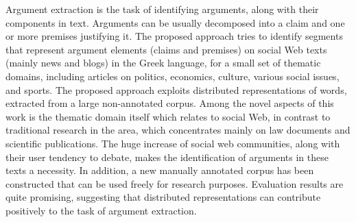 Argument extraction is the task of identifying arguments, along with their components in text. Arguments can be usually decomposed into a claim and one or more premises justifying it. The proposed approach tries to identify segments that represent argument elements (claims and premises) on social Web texts (mainly news and blogs) in the Greek language, for a small set of thematic domains, including articles on politics, economics, culture, various social issues, and sports. The proposed approach exploits distributed representations of words, extracted from a large non-annotated corpus. Among the novel aspects of this work is the thematic domain itself which relates to social Web, in contrast to traditional research in the area, which concentrates mainly on law documents and scientific publications. The huge increase of social web communities, along with their user tendency to debate, makes the identification of arguments in these texts a necessity. In addition, a new manually annotated corpus has been constructed that can be used freely for research purposes. Evaluation results are quite promising, suggesting that distributed representations can contribute positively to the task of argument extraction.
